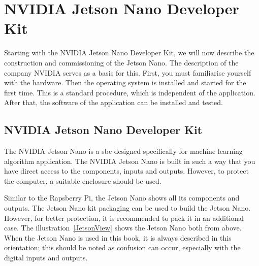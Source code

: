 %
%



   
\chapter{NVIDIA Jetson Nano Developer Kit}\label{JetsonNano:DeveloperKit}

Starting with the NVIDIA Jetson Nano Developer Kit, we will now describe the construction and commissioning of the Jetson Nano. The description of the company NVIDIA \cite{JetsonGettingStarted:2019} serves as a basis for this. First, you must familiarise yourself with the hardware.  Then the operating system is installed and started for the first time. This is a standard procedure, which is independent of the application. After that, the software of the application can be installed and tested.


\section{NVIDIA Jetson Nano Developer Kit}

The NVIDIA Jetson Nano is a \ac{sbc} designed specifically for machine learning algorithm application. The NVIDIA Jetson Nano is built in such a way that you have direct access to the components, inputs and outputs. However, to protect the computer, a suitable enclosure should be used. %



Similar to the Rapsberry Pi, the Jetson Nano shows all its components and outputs. The Jetson Nano kit packaging can be used to build the Jetson Nano.  However, for better protection, it is recommended to pack it in an additional case. The illustration~\ref{JetsonView} shows the Jetson Nano both from above. When the Jetson Nano is used in this book, it is always described in this orientation; this should be noted as confusion can occur, especially with the digital inputs and outputs.


%	
%	


